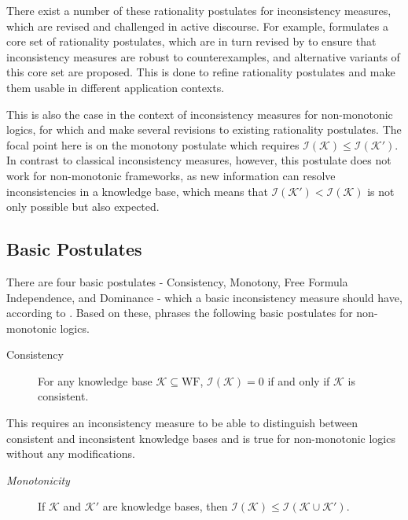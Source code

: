 There exist a number of these rationality postulates for inconsistency measures, which are revised and challenged in active discourse. For example, \cite{hunter_measure_2010} formulates a core set of rationality postulates, which are in turn revised by \cite{hameurlain_basic_2017} to ensure that inconsistency measures are robust to counterexamples, and alternative variants of this core set are proposed. This is done to refine rationality postulates and make them usable in different application contexts.

This is also the case in the context of inconsistency measures for non-monotonic logics, for which \cite{ulbricht_measuring_2018} and \cite{ulbricht_handling_2020} make several revisions to existing rationality postulates. The focal point here is on the monotony postulate which requires \(\mathcal{I}(\mathcal{K}) \leq \mathcal{I}(\mathcal{K}')\). In contrast to classical inconsistency measures, however, this postulate does not work for non-monotonic frameworks, as new information can resolve inconsistencies in a knowledge base, which means that \(\mathcal{I}(\mathcal{K}') < \mathcal{I}(\mathcal{K})\) is not only possible but also expected.

\subsection{Basic Postulates}
There are four basic postulates - Consistency, Monotony, Free Formula Independence, and Dominance - which a basic inconsistency measure should have, according to \cite{hunter_measure_2010}. Based on these, \cite{ulbricht_handling_2020} phrases the following basic postulates for non-monotonic logics.

\begin{description}
    \item[Consistency] For any knowledge base \(\mathcal{K} \subseteq \text{WF}\), \(\mathcal{I}(\mathcal{K}) = 0\) if and only if \(\mathcal{K}\) is consistent.
\end{description}

This requires an inconsistency measure to be able to distinguish between consistent and inconsistent knowledge bases and is true for non-monotonic logics without any modifications.

\begin{description}
    \item[\textit{Monotonicity}] If \(\mathcal{K}\) and \(\mathcal{K}'\) are knowledge bases, then \(\mathcal{I}(\mathcal{K}) \leq \mathcal{I}(\mathcal{K \cup \mathcal{K}'})\).
\end{description}

